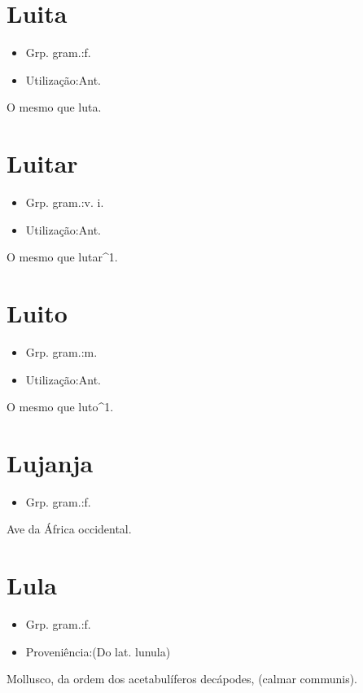 \section{Luita}
\begin{itemize}
\item {Grp. gram.:f.}
\end{itemize}
\begin{itemize}
\item {Utilização:Ant.}
\end{itemize}
O mesmo que \textunderscore luta\textunderscore .
\section{Luitar}
\begin{itemize}
\item {Grp. gram.:v. i.}
\end{itemize}
\begin{itemize}
\item {Utilização:Ant.}
\end{itemize}
O mesmo que \textunderscore lutar\textunderscore ^1.
\section{Luito}
\begin{itemize}
\item {Grp. gram.:m.}
\end{itemize}
\begin{itemize}
\item {Utilização:Ant.}
\end{itemize}
O mesmo que \textunderscore luto\textunderscore ^1.
\section{Lujanja}
\begin{itemize}
\item {Grp. gram.:f.}
\end{itemize}
Ave da África occidental.
\section{Lula}
\begin{itemize}
\item {Grp. gram.:f.}
\end{itemize}
\begin{itemize}
\item {Proveniência:(Do lat. \textunderscore lunula\textunderscore )}
\end{itemize}
Mollusco, da ordem dos acetabulíferos decápodes, (\textunderscore calmar communis\textunderscore ).
